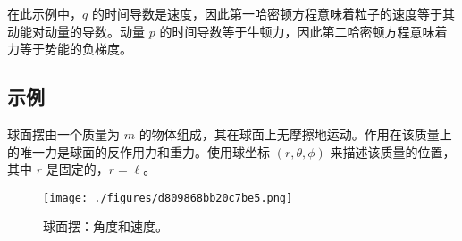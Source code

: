 在此示例中，\( q \) 的时间导数是速度，因此第一哈密顿方程意味着粒子的速度等于其动能对动量的导数。动量 \( p \) 的时间导数等于牛顿力，因此第二哈密顿方程意味着力等于势能的负梯度。
\subsection{示例}   
球面摆由一个质量为 \( m \) 的物体组成，其在球面上无摩擦地运动。作用在该质量上的唯一力是球面的反作用力和重力。使用球坐标 \( (r, \theta, \phi) \) 来描述该质量的位置，其中 \( r \) 是固定的，\( r = \ell \)。
\begin{figure}[ht]
\centering
\texttt{[image: ./figures/d809868bb20c7be5.png]}
\caption{球面摆：角度和速度。} \label{fig_HMD_2}
\end{figure}